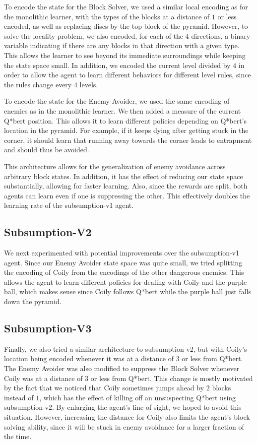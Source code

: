 \documentclass[journal,hidelinks]{IEEEtran}
\begin{document}
To encode the state for the Block Solver, we used a similar local encoding as for the monolithic learner, with the types of the blocks at a distance of $1$ or less encoded, as well as replacing discs by the top block of the pyramid. However, to solve the locality problem, we also encoded, for each of the $4$ directions, a binary variable indicating if there are any blocks in that direction with a given type. This allows the learner to see beyond its immediate surroundings while keeping the state space small. In addition, we encoded the current level divided by $4$ in order to allow the agent to learn different behaviors for different level rules, since the rules change every $4$ levels.

To encode the state for the Enemy Avoider, we used the same encoding of enemies as in the monolithic learner. We then added a measure of the current Q*bert position. This allows it to learn different policies depending on Q*bert's location in the pyramid. For example, if it keeps dying after getting stuck in the corner, it should learn that running away towards the corner leads to entrapment and should thus be avoided.

This architecture allows for the generalization of enemy avoidance across arbitrary block states. In addition, it has the effect of reducing our state space substantially, allowing for faster learning. Also, since the rewards are split, both agents can learn even if one is suppressing the other. This effectively doubles the learning rate of the subsumption-v1 agent.

\subsection{Subsumption-V2}

We next experimented with potential improvements over the subsumption-v1 agent. Since our Enemy Avoider state space was quite small, we tried splitting the encoding of Coily from the encodings of the other dangerous enemies. This allows the agent to learn different policies for dealing with Coily and the purple ball, which makes sense since Coily follows Q*bert while the purple ball just falls down the pyramid.

\subsection{Subsumption-V3}

Finally, we also tried a similar architecture to subsumption-v2, but with Coily's location being encoded whenever it was at a distance of $3$ or less from Q*bert. The Enemy Avoider was also modified to suppress the Block Solver whenever Coily was at a distance of $3$ or less from Q*bert. This change is mostly motivated by the fact that we noticed that Coily sometimes jumps ahead by $2$ blocks instead of $1$, which has the effect of killing off an unsuspecting Q*bert using subsumption-v2. By enlarging the agent's line of sight, we hoped to avoid this situation. However, increasing the distance for Coily also limits the agent's block solving ability, since it will be stuck in enemy avoidance for a larger fraction of the time.
\end{document}
